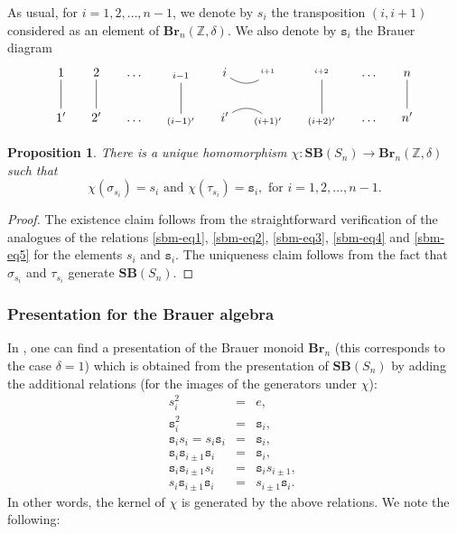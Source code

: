 \documentclass[a4paper]{amsart}
\newtheorem{proposition}[theorem]{Proposition}
\begin{document}
As usual, for $i=1,2,\dots,n-1$, we denote by $s_i$ the 
transposition $(i,i+1)$  considered as an element of 
$\mathbf{Br}_n(\mathbb{Z},\delta)$. We also denote by 
$\mathtt{s}_i$ the Brauer diagram
\begin{displaymath}
\xymatrix@R=7mm@C=5mm{
1\ar@{-}[d]&2\ar@{-}[d]&\dots&{}_{i-1}\ar@{-}[d]&i\ar@/_8pt/@{-}[r]&{}^{{}_{i+1}}
&{}^{{}_{i+2}}\ar@{-}[d]&\dots&n\ar@{-}[d]\\
1'&2'&\dots&{}_{(i-1)'}&i'\ar@/^8pt/@{-}[r]&{}_{(i+1)'}&{}_{(i+2)'}&\dots&n'
}
\end{displaymath}


\begin{proposition}\label{prop-4.4.2-1}
There is a unique homomorphism $\chi:\mathbf{SB}(S_n)\to
\mathbf{Br}_n(\mathbb{Z},\delta)$ such that
\begin{displaymath}
\chi(\sigma_{s_i})=s_i\text{ and }
\chi(\tau_{s_i})=\mathtt{s}_i,\text{ for }i=1,2,\dots,n-1.
\end{displaymath}
\end{proposition}

\begin{proof}
The existence claim follows from the straightforward verification of the 
analogues  of the relations \eqref{sbm-eq1}, \eqref{sbm-eq2}, \eqref{sbm-eq3}, 
\eqref{sbm-eq4} and \eqref{sbm-eq5} for the elements $s_i$ and $\mathtt{s}_i$.
The uniqueness claim follows from the fact that $\sigma_{s_i}$ and $\tau_{s_i}$
generate $\mathbf{SB}(S_n)$. 
\end{proof}

\subsubsection{Presentation for the Brauer algebra}\label{s4.4.3}

In \cite[Theorem~3.1]{KuMaz}, one can find a presentation of the Brauer
monoid $\mathbf{Br}_n$ (this corresponds to the case $\delta=1$) which is obtained from
the presentation of $\mathbf{SB}(S_n)$ by adding the additional relations
(for the images of the generators under $\chi$):
\begin{eqnarray}
s_i^2&=&e,\,\,\label{rel-br.0}\\
\mathtt{s}_i^2&=&\mathtt{s}_i,\,\, \label{rel-br.1}\\
\mathtt{s}_is_i=s_i\mathtt{s}_i&=&\mathtt{s}_i,\,\, \label{rel-br.3}\\
\mathtt{s}_i\mathtt{s}_{i\pm 1}\mathtt{s}_i&=&\mathtt{s}_i,\,\,\label{rel-br.2}\\
\mathtt{s}_i \mathtt{s}_{i\pm 1}{s}_i&=&\mathtt{s}_is_{i\pm 1},\,\,\label{rel-br.4}\\
{s}_i\mathtt{s}_{i\pm 1}\mathtt{s}_i&=&s_{i\pm 1}\mathtt{s}_i.\label{rel-br.5}
\end{eqnarray}
In other words, the kernel of $\chi$ is generated by the above relations.
We note the following:
\end{document}
